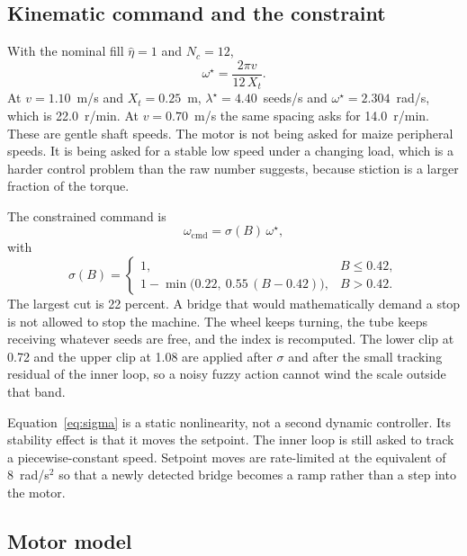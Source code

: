 \subsection{Kinematic command and the constraint}

With the nominal fill $\hat\eta=1$ and $N_c=12$,
\begin{equation}
\omega^{\star} = \frac{2\pi v}{12\, X_t}.
\label{eq:wstar2}
\end{equation}
At $v=1.10$~m/s and $X_t=0.25$~m, $\lambda^{\star}=4.40$~seeds/s and $\omega^{\star}=2.304$~rad/s, which is 22.0~r/min. At $v=0.70$~m/s the same spacing asks for 14.0~r/min. These are gentle shaft speeds. The motor is not being asked for maize peripheral speeds. It is being asked for a stable low speed under a changing load, which is a harder control problem than the raw number suggests, because stiction is a larger fraction of the torque.

The constrained command is
\begin{equation}
\omega_{\mathrm{cmd}} = \sigma(B)\,\omega^{\star},
\label{eq:wcmd}
\end{equation}
with
\begin{equation}
\sigma(B) =
\begin{cases}
1, & B \le 0.42,\\[4pt]
1 - \min\big(0.22,\ 0.55\,(B-0.42)\big), & B > 0.42.
\end{cases}
\label{eq:sigma}
\end{equation}
The largest cut is 22 percent. A bridge that would mathematically demand a stop is not allowed to stop the machine. The wheel keeps turning, the tube keeps receiving whatever seeds are free, and the index is recomputed. The lower clip at 0.72 and the upper clip at 1.08 are applied after $\sigma$ and after the small tracking residual of the inner loop, so a noisy fuzzy action cannot wind the scale outside that band.

Equation~\eqref{eq:sigma} is a static nonlinearity, not a second dynamic controller. Its stability effect is that it moves the setpoint. The inner loop is still asked to track a piecewise-constant speed. Setpoint moves are rate-limited at the equivalent of 8~rad/s$^2$ so that a newly detected bridge becomes a ramp rather than a step into the motor.

\subsection{Motor model}

